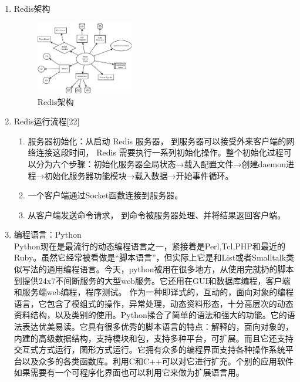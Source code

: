 \documentclass[proposal]{zjutreport}
\begin{document}
\begin{enumerate}[label=（\arabic*）]
\item{Redis架构

\begin{figure}[htbp]
\centering
\includegraphics[width=0.4\textwidth]{redis-server}
\caption{Redis架构}\label{fig:redis-server}
\vspace{\baselineskip}
\end{figure}
}

\item{Redis运行流程[22]
\begin{enumerate}[label=\arabic*.]
\item{服务器初始化：从启动 Redis 服务器， 到服务器可以接受外来客户端的网络连接这段时间， Redis 需要执行一系列初始化操作。整个初始化过程可以分为六个步骤：初始化服务器全局状态→载入配置文件→创建daemon进程→初始化服务器功能模块→载入数据→开始事件循环。
}
\item{一个客户端通过Socket函数连接到服务器。}
\item{从客户端发送命令请求， 到命令被服务器处理、并将结果返回客户端。}
\end{enumerate}
}

\item{编程语言：Python\\
Python现在是最流行的动态编程语言之一，紧接着是Perl,Tcl,PHP和最近的Ruby。虽然它经常被看做是“脚本语言”，但实际上它是和List或者Smalltalk类似写法的通用编程语言。今天，python被用在很多地方，从使用完就扔的脚本到提供24x7不间断服务的大型web服务。它还用在GUI和数据库编程，客户端和服务端web编程，程序测试。
作为一种即译式的，互动的，面向对象的编程语言，它包含了模组式的操作，异常处理，动态资料形态，十分高层次的动态资料结构，以及类别的使用。Python揉合了简单的语法和强大的功能。它的语法表达优美易读。它具有很多优秀的脚本语言的特点：解释的，面向对象的，内建的高级数据结构，支持模块和包，支持多种平台，可扩展。而且它还支持交互式方式运行，图形方式运行。它拥有众多的编程界面支持各种操作系统平台以及众多的各类函数库。利用C和C++可以对它进行扩充。个别的应用软件如果需要有一个可程序化界面也可以利用它来做为扩展语言用。

}
\end{enumerate}
\end{document}
